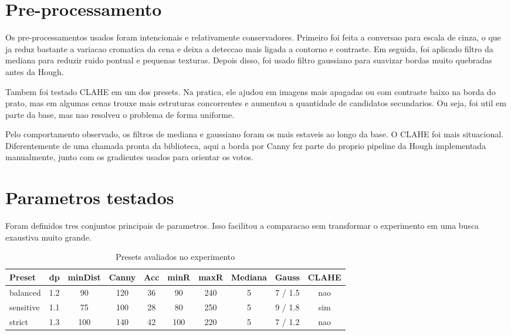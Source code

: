 \documentclass[12pt,a4paper]{article}
\begin{document}
\section{Pre-processamento}

Os pre-processamentos usados foram intencionais e relativamente conservadores. Primeiro foi feita a conversao para escala de cinza, o que ja reduz bastante a variacao cromatica da cena e deixa a deteccao mais ligada a contorno e contraste. Em seguida, foi aplicado filtro da mediana para reduzir ruido pontual e pequenas texturas. Depois disso, foi usado filtro gaussiano para suavizar bordas muito quebradas antes da Hough.

Tambem foi testado CLAHE em um dos presets. Na pratica, ele ajudou em imagens mais apagadas ou com contraste baixo na borda do prato, mas em algumas cenas trouxe mais estruturas concorrentes e aumentou a quantidade de candidatos secundarios. Ou seja, foi util em parte da base, mas nao resolveu o problema de forma uniforme.

Pelo comportamento observado, os filtros de mediana e gaussiano foram os mais estaveis ao longo da base. O CLAHE foi mais situacional. Diferentemente de uma chamada pronta da biblioteca, aqui a borda por Canny fez parte do proprio pipeline da Hough implementada manualmente, junto com os gradientes usados para orientar os votos.

\section{Parametros testados}

Foram definidos tres conjuntos principais de parametros. Isso facilitou a comparacao sem transformar o experimento em uma busca exaustiva muito grande.

\begin{table}[H]
    \centering
    \caption{Presets avaliados no experimento}
    \begin{tabular}{>{\raggedright\arraybackslash}p{2.5cm}ccccccccc}
        \toprule
        Preset & dp & minDist & Canny & Acc & minR & maxR & Mediana & Gauss & CLAHE \\
        \midrule
        balanced  & 1.2 & 90  & 120 & 36 & 90  & 240 & 5 & 7 / 1.5 & nao \\
        sensitive & 1.1 & 75  & 100 & 28 & 80  & 250 & 5 & 9 / 1.8 & sim \\
        strict    & 1.3 & 100 & 140 & 42 & 100 & 220 & 5 & 7 / 1.2 & nao \\
        \bottomrule
    \end{tabular}
\end{table}
\end{document}
